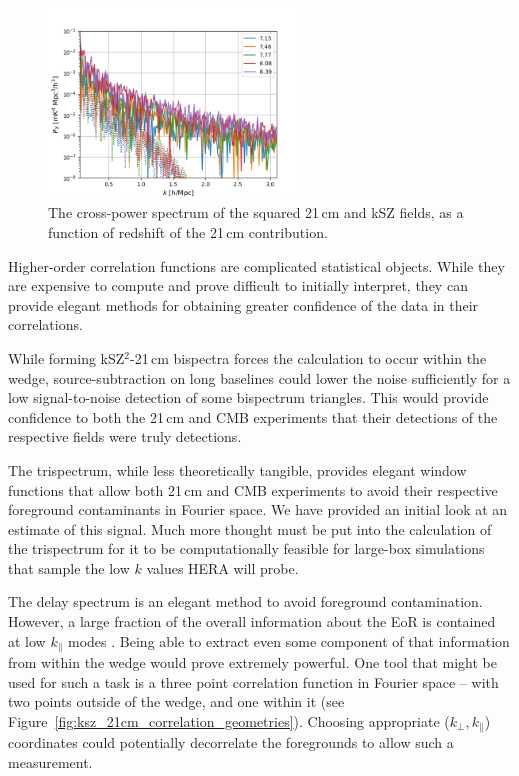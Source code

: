\begin{figure}
\centering
\includegraphics[width=0.6\textwidth]{chapters/ksz_21cm/figures/trispec_estimator_filt_and_unfilt.png}
\caption[The cross-power spectrum of the squared 21\,cm and kSZ fields, as a function of redshift of the 21\,cm contribution.]{The cross-power spectrum of the squared 21\,cm and kSZ fields, as a function of redshift of the 21\,cm contribution.}
\label{fig:trispec_estimator_filt_unfilt}
\end{figure}

Higher-order correlation functions are complicated statistical objects. While they are expensive to compute and prove difficult to initially interpret, they can provide elegant methods for obtaining greater confidence of the data in their correlations. 

While forming kSZ$^2$-21\,cm bispectra forces the calculation to occur within the wedge, source-subtraction on long baselines could lower the noise sufficiently for a low signal-to-noise detection of some bispectrum triangles. This would provide confidence to both the 21\,cm and CMB experiments that their detections of the respective fields were truly detections.

The trispectrum, while less theoretically tangible, provides elegant window functions that allow both 21\,cm and CMB experiments to avoid their respective foreground contaminants in Fourier space. We have provided an initial look at an estimate of this signal. Much more thought must be put into the calculation of the trispectrum for it to be computationally feasible for large-box simulations that sample the low $k$ values HERA will probe.

The delay spectrum is an elegant method to avoid foreground contamination. However, a large fraction of the overall information about the EoR is contained at low $k_{\parallel}$ modes \citep[e.g.][]{Jensen.16}. Being able to extract even some component of that information from within the wedge would prove extremely powerful. One tool that might be used for such a task is a three point correlation function in Fourier space -- with two points outside of the wedge, and one within it (see Figure~\ref{fig:ksz_21cm_correlation_geometries}). Choosing appropriate ($k_{\perp},k_{\parallel}$) coordinates could potentially decorrelate the foregrounds to allow such a measurement.
